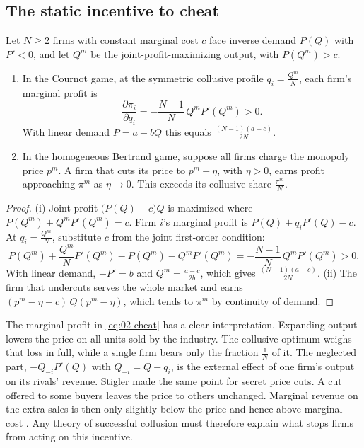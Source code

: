 \subsection{The static incentive to cheat}\label{sec:02-cheat}

\begin{proposition}\label{prop:02-cheat}
Let $N \ge 2$ firms with constant marginal cost $c$ face inverse demand $P(Q)$ with $P' < 0$, and let $Q^m$ be the
joint-profit-maximizing output, with $P(Q^m) > c$.
\begin{enumerate}[label=(\roman*)]
\item In the Cournot game, at the symmetric collusive profile $q_i = \frac{Q^m}{N}$, each firm's marginal profit is
\begin{equation}\label{eq:02-cheat}
\frac{\partial \pi_i}{\partial q_i} = -\frac{N - 1}{N}\,Q^m P'(Q^m) > 0 .
\end{equation}
With linear demand $P = a - bQ$ this equals $\frac{(N - 1)(a - c)}{2N}$.
\item In the homogeneous Bertrand game, suppose all firms charge the monopoly price $p^m$. A firm that cuts its
price to $p^m - \eta$, with $\eta > 0$, earns profit approaching $\pi^m$ as $\eta \to 0$. This exceeds its
collusive share $\frac{\pi^m}{N}$.
\end{enumerate}
\end{proposition}

\begin{proof}
(i) Joint profit $\bigl(P(Q) - c\bigr)Q$ is maximized where $P(Q^m) + Q^mP'(Q^m) = c$. Firm $i$'s marginal profit is
$P(Q) + q_iP'(Q) - c$. At $q_i = \frac{Q^m}{N}$, substitute $c$ from the joint first-order condition:
\begin{equation*}
P(Q^m) + \frac{Q^m}{N}P'(Q^m) - P(Q^m) - Q^mP'(Q^m) = -\frac{N - 1}{N}\,Q^mP'(Q^m) > 0 .
\end{equation*}
With linear demand, $-P' = b$ and $Q^m = \frac{a - c}{2b}$, which gives $\frac{(N - 1)(a - c)}{2N}$. (ii) The firm
that undercuts serves the whole market and earns $(p^m - \eta - c)\,Q(p^m - \eta)$, which tends to $\pi^m$ by
continuity of demand.
\end{proof}

The marginal profit in \eqref{eq:02-cheat} has a clear interpretation. Expanding output lowers the price on all
units sold by the industry. The collusive optimum weighs that loss in full, while a single firm bears only the
fraction $\frac{1}{N}$ of it. The neglected part, $-Q_{-i}P'(Q)$ with $Q_{-i} = Q - q_i$, is the external effect of
one firm's output on its rivals' revenue. Stigler made the same point for secret price cuts. A cut offered to some
buyers leaves the price to others unchanged. Marginal revenue on the extra sales is then only slightly below the
price and hence above marginal cost \citep[footnote 3]{Stigler1964}. Any theory of successful collusion must therefore
explain what stops firms from acting on this incentive.

